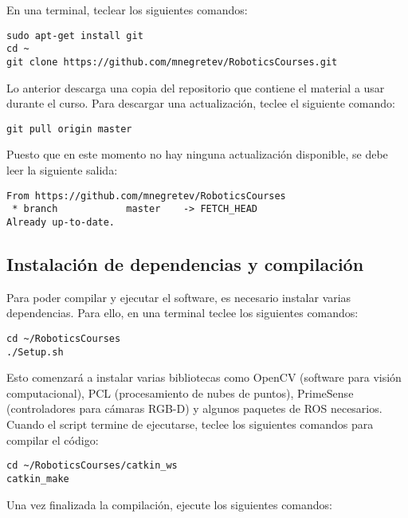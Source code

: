 \documentclass[letterpaper,12pt]{article}
\begin{document}
En una terminal, teclear los siguientes comandos:
\begin{verbatim}
sudo apt-get install git
cd ~
git clone https://github.com/mnegretev/RoboticsCourses.git
\end{verbatim}
Lo anterior descarga una copia del repositorio que contiene el material a usar durante el curso. Para descargar una actualización, teclee el siguiente comando:
\begin{verbatim}
git pull origin master
\end{verbatim}
Puesto que en este momento no hay ninguna actualización disponible, se debe leer la siguiente salida:
\begin{verbatim}
From https://github.com/mnegretev/RoboticsCourses
 * branch            master    -> FETCH_HEAD
Already up-to-date.
\end{verbatim}

\subsection{Instalación de dependencias y compilación}
Para poder compilar y ejecutar el software, es necesario instalar varias dependencias. Para ello, en una terminal teclee los siguientes comandos:
\begin{verbatim}
cd ~/RoboticsCourses
./Setup.sh
\end{verbatim}

Esto comenzará a instalar varias bibliotecas como OpenCV (software para visión computacional), PCL (procesamiento de nubes de puntos), PrimeSense (controladores para cámaras RGB-D) y algunos paquetes de ROS necesarios. Cuando el script termine de ejecutarse, teclee los siguientes comandos para compilar el código:
\begin{verbatim}
cd ~/RoboticsCourses/catkin_ws
catkin_make
\end{verbatim}

Una vez finalizada la compilación, ejecute los siguientes comandos:
\end{document}
